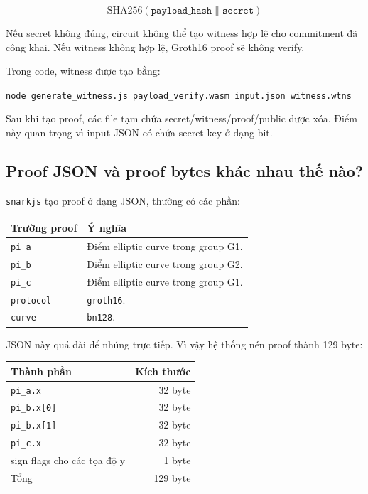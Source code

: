 \documentclass[11pt,a4paper]{article}
\begin{document}
\[
  \mathrm{SHA256}(\texttt{payload\_hash} \parallel \texttt{secret})
\]

Nếu secret không đúng, circuit không thể tạo witness hợp lệ cho commitment đã
công khai. Nếu witness không hợp lệ, Groth16 proof sẽ không verify.

Trong code, witness được tạo bằng:

\begin{center}
\texttt{node generate\_witness.js payload\_verify.wasm input.json witness.wtns}
\end{center}

Sau khi tạo proof, các file tạm chứa secret/witness/proof/public được xóa.
Điểm này quan trọng vì input JSON có chứa secret key ở dạng bit.

\subsection{Proof JSON và proof bytes khác nhau thế nào?}

\texttt{snarkjs} tạo proof ở dạng JSON, thường có các phần:

\begin{center}
\begin{tabular}{lp{85mm}}
\toprule
Trường proof & Ý nghĩa \\
\midrule
\texttt{pi\_a} & Điểm elliptic curve trong group G1. \\
\texttt{pi\_b} & Điểm elliptic curve trong group G2. \\
\texttt{pi\_c} & Điểm elliptic curve trong group G1. \\
\texttt{protocol} & \texttt{groth16}. \\
\texttt{curve} & \texttt{bn128}. \\
\bottomrule
\end{tabular}
\end{center}

JSON này quá dài để nhúng trực tiếp. Vì vậy hệ thống nén proof thành 129 byte:

\begin{center}
\begin{tabular}{lr}
\toprule
Thành phần & Kích thước \\
\midrule
\texttt{pi\_a.x} & 32 byte \\
\texttt{pi\_b.x[0]} & 32 byte \\
\texttt{pi\_b.x[1]} & 32 byte \\
\texttt{pi\_c.x} & 32 byte \\
sign flags cho các tọa độ y & 1 byte \\
\midrule
Tổng & 129 byte \\
\bottomrule
\end{tabular}
\end{center}
\end{document}
